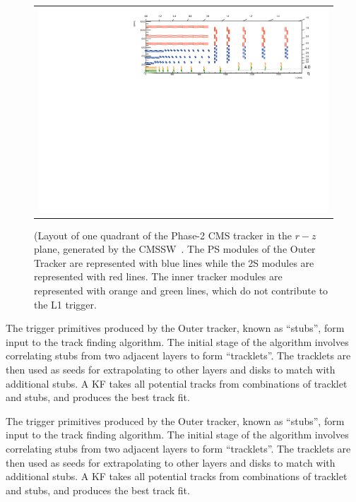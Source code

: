 \begin{figure}[tbh!]
 \begin{center}
  \begin{tabular}{c}
   \centering\includegraphics[width=0.9\linewidth]{figures/Part2/Upgrade/TrackerGeo}
  \end{tabular}
  \caption{(Layout of one quadrant of the Phase-2 \ac{CMS} tracker in the $r-z$ plane, generated by the \ac{CMSSW}~\cite{cmssw}. The PS modules of the Outer Tracker are represented with blue lines while the 2S modules are represented with red lines. The inner tracker modules are represented with orange and green lines, which do not contribute to the \ac{L1} trigger.}
 \label{fig:TrackerGeo}
 \end{center}
\end{figure}

The trigger primitives produced by the Outer tracker, known as ``stubs'', form input to the track finding algorithm. The initial stage of the algorithm involves correlating stubs from two adjacent layers to form ``tracklets''. The tracklets are then used as seeds for extrapolating to other layers and disks to match with additional stubs. A \ac{KF} takes all potential tracks from combinations of tracklet and stubs, and produces the best track fit.

The trigger primitives produced by the Outer tracker, known as ``stubs'', form input to the track finding algorithm. The initial stage of the algorithm involves correlating stubs from two adjacent layers to form ``tracklets''. The tracklets are then used as seeds for extrapolating to other layers and disks to match with additional stubs. A \ac{KF} takes all potential tracks from combinations of tracklet and stubs, and produces the best track fit.

